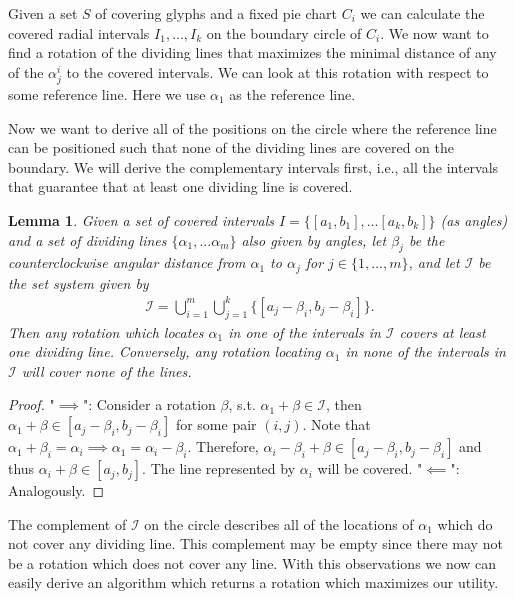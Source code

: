 \documentclass[a4paper,11pt]{article}
\newtheorem{lemma}{Lemma}
\begin{document}
Given a set $S$ of covering glyphs and a fixed pie chart $C_i$ we can calculate the covered radial intervals $I_1,...,I_k$ on the boundary circle of $C_i$. We now want to find a rotation of the dividing lines that maximizes the minimal distance of any of the $\alpha^i_j$ to the covered intervals. We can look at this rotation with respect to some reference line. Here we use $\alpha_1$ as the reference line.

Now we want to derive all of the positions on the circle where the reference line can be positioned such that none of the dividing lines are covered on the boundary. We will derive the complementary intervals first, i.e., all the intervals that guarantee that at least one dividing line is covered.

\begin{lemma}
  Given a set of covered intervals $I=\{[a_1,b_1],...[a_k,b_k]\}$ (as angles) and a set of dividing lines $\{\alpha_1,...\alpha_m\}$ also given by angles, let $\beta_j$ be the counterclockwise angular distance from $\alpha_1$ to $\alpha_j$ for $j\in\{1,\dots,m\}$, and let $\mathcal{I}$ be the set system given by
  \begin{align*}
    \mathcal{I}=\bigcup_{i=1}^m    \bigcup_{j=1}^k \{ [a_j-\beta_i,b_j-\beta_i]   \}.
  \end{align*}
  Then any rotation which locates $\alpha_1$ in one of the intervals in $\mathcal{I}$ covers at least one dividing line. Conversely, any rotation locating $\alpha_1$ in none of the intervals in $\mathcal{I}$ will cover none of the lines.
\end{lemma}

\begin{proof}
  "$\implies$": Consider a rotation $\beta$, s.t. $\alpha_1 + \beta \in \mathcal{I}$, then $\alpha_1 + \beta \in [a_j - \beta_i, b_j-\beta_i]$ for some pair $(i,j)$. Note that $\alpha_1 + \beta_i = \alpha_i \implies \alpha_1 = \alpha_i - \beta_i$. Therefore, $\alpha_i-\beta_i+\beta\in[a_j-\beta_i, b_j-\beta_i]$ and thus $\alpha_i+\beta\in[a_j, b_j]$. The line represented by $\alpha_i$ will be covered.
  "$\impliedby$": Analogously.
\end{proof}

The complement of $\mathcal{I}$ on the circle describes all of the locations of $\alpha_1$ which do not cover any dividing line. This complement may be empty since there may not be a rotation which does not cover any line. With this observations we now can easily derive an algorithm which returns a rotation which maximizes our utility.
\end{document}
